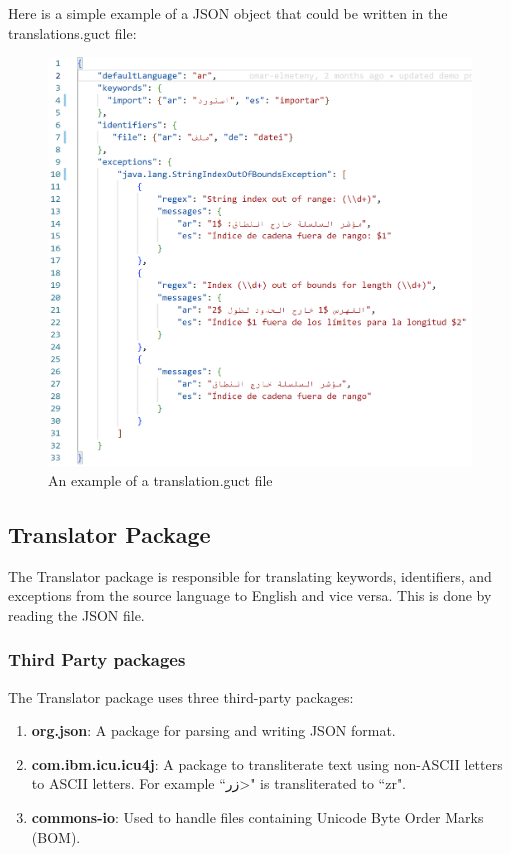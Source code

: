 Here is a simple example of a JSON object that could be written in the translations.guct file: 

\begin{figure}[H]
\centering
\includegraphics[width=12.5cm]{ch3-images/translationsfile.png}
\caption{An example of a translation.guct file}
\label{fig:An example of a translation.guct file}
\end{figure} 

\subsection{Translator Package}
The Translator package is responsible for translating keywords, identifiers, and exceptions from the source language to English and vice versa. This is done by reading the JSON file.
\subsubsection{Third Party packages}
The Translator package uses three third-party packages:
\begin{enumerate}
    \item \textbf{org.json}: A package for parsing and writing JSON format.
    \item \textbf{com.ibm.icu.icu4j}: A package to transliterate text using non-ASCII letters to ASCII letters. For example ``\<زر>" is transliterated to ``zr".
    \item \textbf{commons-io}: Used to handle files containing Unicode Byte Order Marks (BOM).
\end{enumerate}

